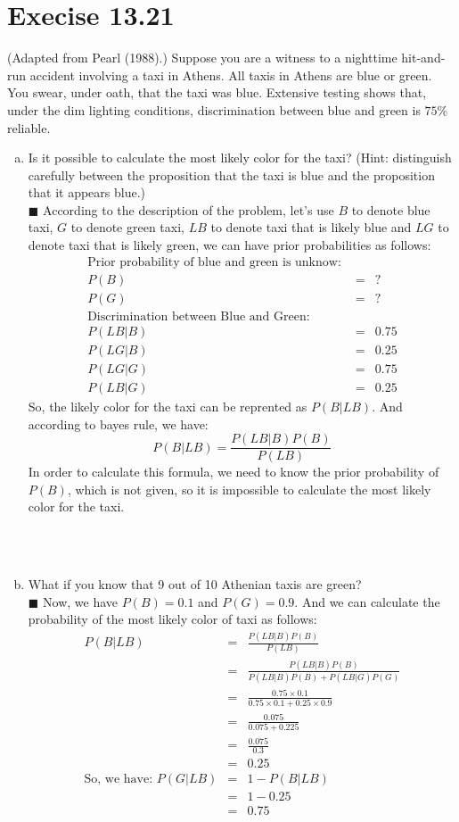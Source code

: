 \documentclass{article}
\newcommand{\solution}[1]{~\\ $\blacksquare$ \sffamily\upshape\selectfont #1
\normalfont ~\\~ }
\begin{document}
\section{Execise 13.21}
(Adapted from Pearl (1988).) Suppose you are a witness to a nighttime
hit-and-run accident involving a taxi in Athens. All taxis in Athens
are blue or green. You swear, under oath, that the taxi was
blue. Extensive testing shows that, under the dim lighting conditions,
discrimination between blue and green is $75\%$ reliable.
\begin{enumerate}[a.]
\item Is it possible to calculate the most likely color for the taxi?
  (Hint: distinguish carefully between the proposition that the taxi is
  blue and the proposition that it appears blue.)
  \solution{According to the description of the problem, let's use $B$
    to denote blue taxi, $G$ to denote green taxi, $LB$ to denote taxi
    that is likely blue and $LG$ to denote taxi that is likely green,
    we can have prior probabilities as follows: \\ 
    \begin{eqnarray*}
      \mbox{Prior probability of blue and green is unknow: } \\
      P(B) & = & ? \\
      P(G) & = & ? \\
      \mbox{Discrimination between Blue and Green: } \\
      P(LB|B) & = & 0.75 \\ 
      P(LG|B) & = & 0.25 \\
      P(LG|G) & = & 0.75 \\
      P(LB|G) & = & 0.25
    \end{eqnarray*}
    So, the likely color for the taxi can be reprented as $P(B|LB)$. 
    And according to bayes rule, we have: \\ 
    \[ P(B|LB)=\frac{P(LB|B)P(B)}{P(LB)} \]
    In order to calculate this formula, we need to know the prior
    probability of $P(B)$, which is not given, so it is impossible to
    calculate the most likely color for the taxi. 
  }
\item What if you know that 9 out of 10 Athenian taxis are green?
  \solution{Now, we have $P(B)=0.1$ and $P(G)=0.9$. And we can
    calculate the probability of the most likely color of taxi as
    follows: \\ 
    \begin{eqnarray*}
      P(B|LB) & = & \frac{P(LB|B)P(B)}{P(LB)} \\
      & = & \frac{P(LB|B)P(B)}{P(LB|B)P(B) + P(LB|G)P(G)} \\
      & = & \frac{0.75\times 0.1}{0.75\times 0.1 + 0.25\times 0.9} \\
      & = & \frac{0.075}{0.075+0.225} \\ 
      & = & \frac{0.075}{0.3} \\
      & = & 0.25 \\ 
      \mbox{So, we have: } P(G|LB) & = & 1-P(B|LB) \\
      & = & 1-0.25 \\
      & = & 0.75
    \end{eqnarray*}
  }
\end{enumerate}
\end{document}

